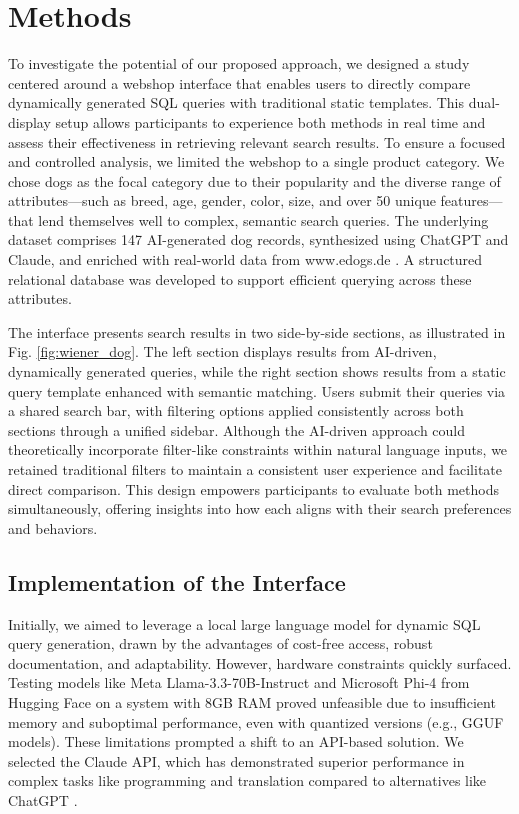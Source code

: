 \documentclass[../../submission.tex]{subfiles}
\begin{document}
\section{Methods}
To investigate the potential of our proposed approach, we designed a study centered around a webshop interface that enables users to directly 
compare dynamically generated SQL queries with traditional static templates. This dual-display setup allows participants to experience both 
methods in real time and assess their effectiveness in retrieving relevant search results. To ensure a focused and controlled analysis, we 
limited the webshop to a single product category. We chose dogs as the focal category due to their popularity and the diverse range of attributes—such as 
breed, age, gender, color, size, and over 50 unique features—that lend themselves well to complex, semantic search queries. The underlying dataset comprises 
147 AI-generated dog records, synthesized using ChatGPT and Claude, and enriched with real-world data from www.edogs.de \cite{edogsHundemarktHundeOnline}. A 
structured relational database was developed to support efficient querying across these attributes.

The interface presents search results in two side-by-side sections, as illustrated in Fig. \ref{fig:wiener_dog}. 
The left section displays results from AI-driven, dynamically generated queries, while the right section shows results 
from a static query template enhanced with semantic matching. Users submit their queries via a shared search bar, with 
filtering options applied consistently across both sections through a unified sidebar. Although the AI-driven approach could 
theoretically incorporate filter-like constraints within natural language inputs, we retained traditional filters to maintain 
a consistent user experience and facilitate direct comparison. This design empowers participants to evaluate both methods simultaneously, 
offering insights into how each aligns with their search preferences and behaviors.

\subsection{Implementation of the Interface}
Initially, we aimed to leverage a local large language model for dynamic SQL query generation, drawn by the advantages of cost-free access, 
robust documentation, and adaptability. However, hardware constraints quickly surfaced. Testing models like Meta Llama-3.3-70B-Instruct \cite{MetallamaLlama3370BInstructHugging2024} and Microsoft Phi-4 \cite{MicrosoftPhi4Hugging2025} from Hugging Face on a system with 8GB RAM proved unfeasible due to insufficient memory and suboptimal performance, even with quantized versions (e.g., GGUF models). These limitations prompted a shift to an API-based solution. We selected the Claude API, which has demonstrated superior performance in complex tasks like programming and translation compared to alternatives like ChatGPT \cite{soboEvaluatingLLMsCode2025}.
\end{document}
